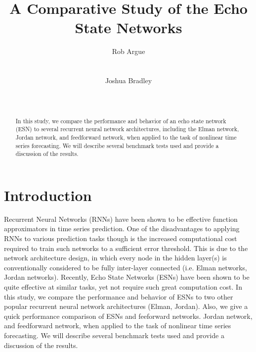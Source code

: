 \documentclass{acm_proc_article-sp}
\begin{document}
\title{A Comparative Study of the Echo State Networks}

\author{
\alignauthor
Rob Argue\\
       \\
       \\
\alignauthor
Joshua Bradley\\
       \\
       \\
}

\maketitle
\begin{abstract}
In this study, we compare the performance and behavior of an echo state network (ESN) to several recurrent neural network architectures, including the Elman network, Jordan network, and feedforward network, when applied to the task of nonlinear time series forecasting. We will describe several benchmark tests used and provide a discussion of the results.
\end{abstract}

\section{Introduction}
Recurrent Neural Networks (RNNs) have been shown to be effective function approximators in time series prediction. One of the disadvantages to applying RNNs to various prediction tasks though is the increased computational cost required to train such networks to a sufficient error threshold. This is due to the network architecture design, in which every node in the hidden layer(s) is conventionally considered to be fully inter-layer connected (i.e. Elman networks, Jordan networks). Recently, Echo State Networks (ESNs) have been shown to be quite effective at similar tasks, yet not require such great computation cost. In this study, we compare the performance and behavior of ESNs to two other popular recurrent neural network architectures (Elman, Jordan). Also, we give a quick performance comparison of ESNs and feeforward networks. Jordan network, and feedforward network, when applied to the task of nonlinear time series forecasting. We will describe several benchmark tests used and provide a discussion of the results.
\end{document}
